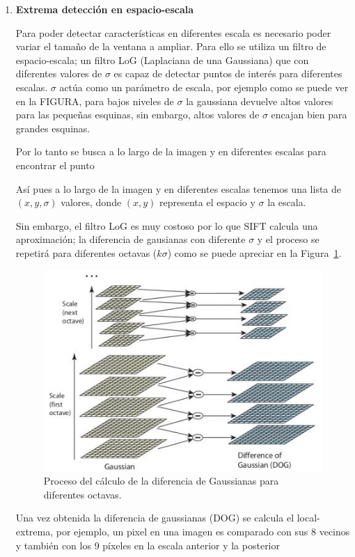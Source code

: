 \begin{enumerate}
\item \textbf{Extrema detección en espacio-escala}

Para poder detectar características en diferentes escala es necesario poder variar el tamaño de la ventana a ampliar. Para ello se utiliza un filtro de espacio-escala; un filtro LoG (Laplaciana de una Gaussiana) que con diferentes valores de $\sigma$ es capaz de detectar puntos de interés para diferentes escalas. $\sigma$ actúa como un parámetro de escala, por ejemplo como se puede ver en la FIGURA, para bajos niveles de $\sigma$ la gaussiana devuelve altos valores para las pequeñas esquinas, sin embargo, altos valores de $\sigma$ encajan bien para grandes esquinas.

Por lo tanto se busca a lo largo de la imagen y en diferentes escalas para encontrar el punto 

Así pues a lo largo de la imagen y en diferentes escalas tenemos una lista de $(x,y,\sigma)$ valores, donde $(x,y)$ representa el espacio y $\sigma$ la escala.

Sin embargo, el filtro LoG es muy costoso por lo que SIFT calcula una aproximación; la diferencia de gausianas con diferente $\sigma$ y el proceso se repetirá para diferentes octavas ($k\sigma$) como se puede apreciar en la Figura~\ref{fig:shif_dog}.

\begin{figure}[ht]
\centering
\includegraphics[scale=0.7]{Figures/sift_dog.jpg}
\decoRule
\caption[shifDog]{Proceso del cálculo de la diferencia de Gaussianas para diferentes octavas.}
\label{fig:shif_dog}
\end{figure}

Una vez obtenida la diferencia de gaussianas (DOG) se calcula el local-extrema, por ejemplo, un pixel en una imagen es comparado con sus 8 vecinos y también con los 9 píxeles en la escala anterior y la posterior 


\end{enumerate}
